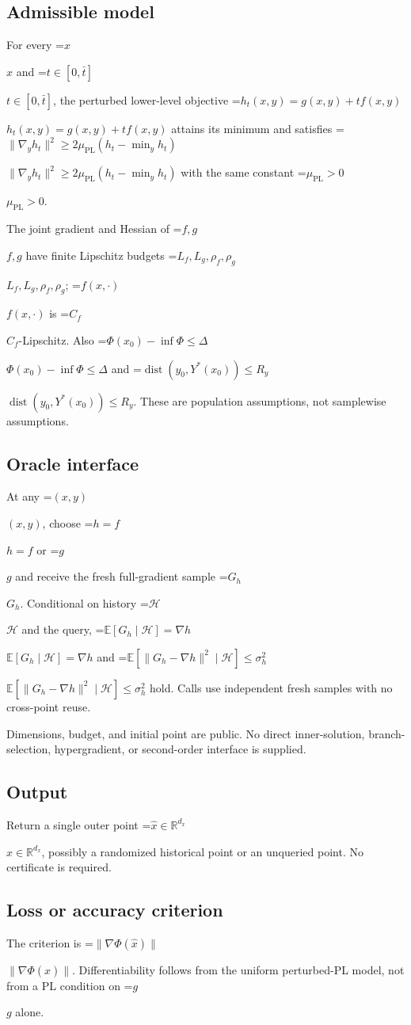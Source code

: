 \documentclass[10pt,a4paper]{article}
\newcommand{\AtlasMath}[1]{\par\begingroup\centering\setbox0=\hbox{$\displaystyle #1$}\ifdim\wd0>1.4\linewidth\typeout{ATLAS WIDE FORMULA: \the\wd0}\fi\ifdim\wd0>\linewidth\resizebox{\linewidth}{!}{\box0}\else\box0\fi\par\endgroup}
\newcommand{\AtlasInlineMath}[1]{\begingroup\setbox0=\hbox{$#1$}\ifdim\wd0>.4\linewidth\endgroup\AtlasMath{#1}\else\endgroup$#1$\fi}
\begin{document}
\subsection{Admissible model}
For every \AtlasInlineMath{x} and \AtlasInlineMath{t\in[0,\bar t]}, the perturbed lower-level objective \AtlasInlineMath{h_t(x,y)=g(x,y)+t f(x,y)} attains its minimum and satisfies \AtlasInlineMath{\|\nabla_yh_t\|^2\ge2\mu_{\mathrm{PL}}(h_t-\min_yh_t)} with the same constant \AtlasInlineMath{\mu_{\mathrm{PL}}>0}.

The joint gradient and Hessian of \AtlasInlineMath{f,g} have finite Lipschitz budgets \AtlasInlineMath{L_f,L_g,\rho_f,\rho_g}; \AtlasInlineMath{f(x,\cdot)} is \AtlasInlineMath{C_f}-Lipschitz. Also \AtlasInlineMath{\Phi(x_0)-\inf\Phi\le\Delta} and \AtlasInlineMath{\operatorname{dist}(y_0,Y^*(x_0))\le R_y}. These are population assumptions, not samplewise assumptions.

\subsection{Oracle interface}
At any \AtlasInlineMath{(x,y)}, choose \AtlasInlineMath{h=f} or \AtlasInlineMath{g} and receive the fresh full-gradient sample \AtlasInlineMath{G_h}. Conditional on history \AtlasInlineMath{\mathcal{H}} and the query, \AtlasInlineMath{\mathbb{E}[G_h\mid\mathcal{H}]=\nabla h} and \AtlasInlineMath{\mathbb{E}[\|G_h-\nabla h\|^2\mid\mathcal{H}]\le\sigma_h^2} hold. Calls use independent fresh samples with no cross-point reuse.

Dimensions, budget, and initial point are public. No direct inner-solution, branch-selection, hypergradient, or second-order interface is supplied.

\subsection{Output}
Return a single outer point \AtlasInlineMath{\widehat{x}\in\mathbb{R}^{d_x}}, possibly a randomized historical point or an unqueried point. No certificate is required.

\subsection{Loss or accuracy criterion}
The criterion is \AtlasInlineMath{\|\nabla\Phi(\widehat x)\|}. Differentiability follows from the uniform perturbed-PL model, not from a PL condition on \AtlasInlineMath{g} alone.
\end{document}
